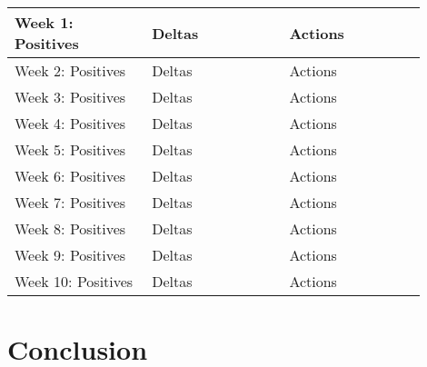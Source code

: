 \documentclass[10pt,journal,compsoc,draftclsnofoot]{IEEEtran}
\begin{document}
\begin{flushleft}
\begin{center}
\begin{table}[H]
\begin{tabular}{ | p{0.3\linewidth} | p{0.3\linewidth} | p{0.3\linewidth} | }
%

Week 1: Positives & 
Deltas & 
Actions \\ \hline

Week 2: Positives & 
Deltas & 
Actions \\ \hline

Week 3: Positives & 
Deltas & 
Actions \\ \hline

Week 4: Positives & 
Deltas & 
Actions \\ \hline

Week 5: Positives & 
Deltas & 
Actions \\ \hline

Week 6: Positives & 
Deltas & 
Actions \\ \hline

Week 7: Positives & 
Deltas & 
Actions \\ \hline

Week 8: Positives & 
Deltas & 
Actions \\ \hline

Week 9: Positives & 
Deltas & 
Actions \\ \hline

Week 10: Positives & 
Deltas & 
Actions \\ \hline

\end{tabular}
\newline
\label{table:retro}
\end{table}
\end{center}
 
\section{Conclusion}


\end{flushleft}
\end{document}
